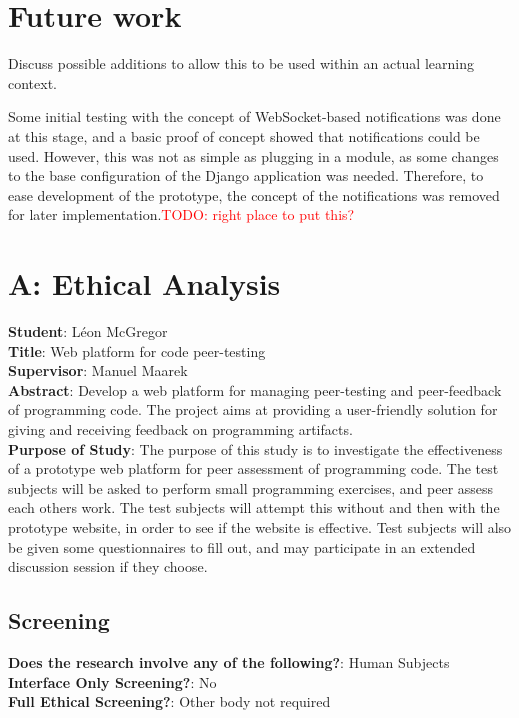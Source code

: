 \documentclass[a4paper,11pt]{report}
\newcommand{\todo}[1]{\textcolor{red}{TODO: #1}}
\begin{document}
\section{Future work}
Discuss possible additions to allow this to be used within an actual learning context.\par
Some initial testing with the concept of WebSocket-based notifications was done at this stage, and a basic proof of concept showed that notifications could be used. However, this was not as simple as plugging in a module, as some changes to the base configuration of the Django application was needed. Therefore, to ease development of the prototype, the concept of the notifications was removed for later implementation.\todo{right place to put this?}\par




\pagebreak
\singlespacing
\printbibliography
{}

\section*{A: Ethical Analysis}
\textbf{Student}: L\'eon McGregor\\
\textbf{Title}: Web platform for code peer-testing\\
\textbf{Supervisor}: Manuel Maarek\\
\textbf{Abstract}: Develop a web platform for managing peer-testing and peer-feedback of programming code. The project aims at providing a user-friendly solution for giving and receiving feedback on programming artifacts.\\
\textbf{Purpose of Study}: The purpose of this study is to investigate the effectiveness of a prototype web platform for peer assessment of programming code. The test subjects will be asked to perform small programming exercises, and peer assess each others work. The test subjects will attempt this without and then with the prototype website, in order to see if the website is effective. Test subjects will also be given some questionnaires to fill out, and may participate in an extended discussion session if they choose.

\subsection*{Screening}
\textbf{Does the research involve any of the following?}: Human Subjects\\
\textbf{Interface Only Screening?}: No\\
\textbf{Full Ethical Screening?}: Other body not required
\end{document}
